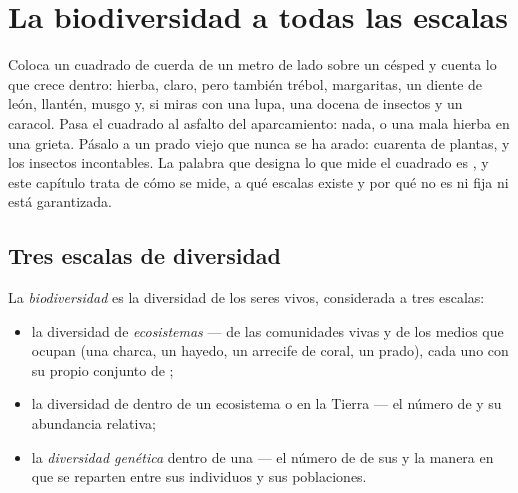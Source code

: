\chapter{La biodiversidad a todas las escalas}\label{ch:g10:biodiversity-scales}

Coloca un cuadrado de cuerda de un metro de lado sobre un césped y
cuenta lo que crece dentro: hierba, claro, pero también trébol,
margaritas, un diente de león, llantén, musgo y, si miras con una lupa,
una docena de insectos y un caracol. Pasa el cuadrado al asfalto del
aparcamiento: nada, o una mala hierba en una grieta. Pásalo a un prado
viejo que nunca se ha arado: cuarenta  de plantas, y los
insectos incontables. La palabra que designa lo que mide el cuadrado es
\emph{}, y este capítulo trata de cómo se mide, a qué
escalas existe y por qué no es ni fija ni está garantizada.

\section{Tres escalas de diversidad}

\begin{definition}[Biodiversidad]\label{def:g10:biodiversity-scales:biodiversity}
La \emph{biodiversidad} es la diversidad de los
seres vivos, considerada a tres escalas:
\begin{itemize}
  \item la diversidad de \emph{ecosistemas} --- de
        las comunidades vivas y de los medios que ocupan (una charca,
        un hayedo, un arrecife de coral, un prado), cada uno con su
        propio conjunto de ;
  \item la diversidad de  dentro de un
        ecosistema o en la Tierra --- el número de  y su
        abundancia relativa;
  \item la \emph{diversidad genética}
        dentro de una  --- el número de  de sus  y la
        manera en que se reparten entre sus individuos y sus
        poblaciones.
\end{itemize}
\end{definition}

